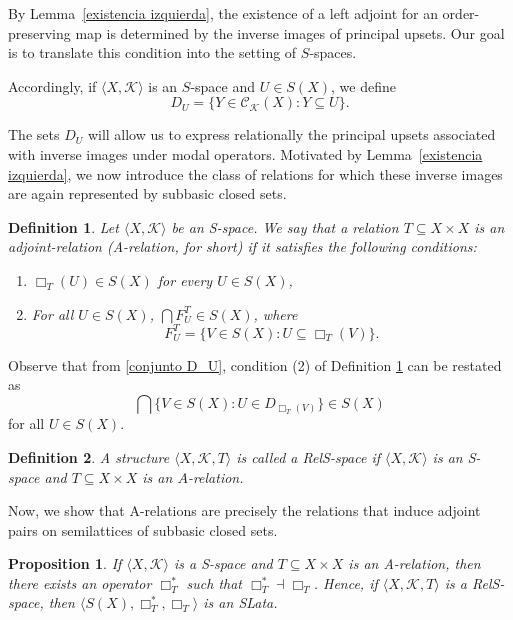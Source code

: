 \documentclass{article}
\newtheorem{definition}{\bf Definition}[section]
\newtheorem{proposition}{\bf Proposition}[section]
\begin{document}
By Lemma~\ref{existencia izquierda}, the existence of a left adjoint for an order-preserving map is determined by the inverse images of principal upsets. Our goal is to translate this condition into the setting of $S$-spaces.

Accordingly, if $\langle X,\mathcal{K}\rangle$ is an $S$-space and $U\in S(X)$, we define
\begin{equation}\label{conjunto D_U}
    D_U=\{Y\in \mathcal{C}_{\mathcal{K}}(X)\colon Y\subseteq U\}.
\end{equation}

The sets $D_U$ will allow us to express relationally the principal upsets associated with inverse images under modal operators. Motivated by Lemma~\ref{existencia izquierda}, we now introduce the class of relations for which these inverse images are again represented by subbasic closed sets.

\begin{definition}\label{A relacion}
    Let $\langle X, \mathcal{K}\rangle$ be an S-space. We say that a relation $T \subseteq X \times X$ is an adjoint-relation (A-relation, for short) if it satisfies the following conditions:
    \begin{enumerate}
        \item $\Box_{T}(U) \in S(X)$ for every $U \in S(X)$,
        \item For all $U \in S(X)$, $\bigcap F_{U}^{T} \in S(X)$, where 
        \[
            F_U^{T} = \{ V \in S(X) \colon U \subseteq \Box_{T}(V) \}.
        \]
    \end{enumerate}
\end{definition}

Observe that from \eqref{conjunto D_U}, condition (2) of Definition \ref{A relacion} can be restated as 
\[\bigcap \{V \in S(X) \colon U\in D_{\Box_T(V)}\} \in S(X)\]
for all $U \in S(X)$. 

\begin{definition}
A structure $\langle X, \mathcal{K}, T \rangle$ is called a RelS-space if $\langle X, \mathcal{K} \rangle$ is an S-space and $T \subseteq X \times X$ is an $A$-relation.
\end{definition}

Now, we show that A-relations are precisely the relations that induce adjoint pairs on semilattices of subbasic closed sets.

\begin{proposition}\label{def box T^{*}}
    If $\langle X, \mathcal{K}\rangle$ is a S-space and $T\subseteq X \times X$ is an A-relation, then there exists an operator $\Box_{T}^{*}$ such that $\Box_{T}^{*} \dashv \Box_{T}$. Hence, if $\langle X, \mathcal{K}, T \rangle$ is a RelS-space, then $\langle S(X), \Box_{T}^{*},\Box_{T}\rangle$ is an SLata.
\end{proposition}
\end{document}
